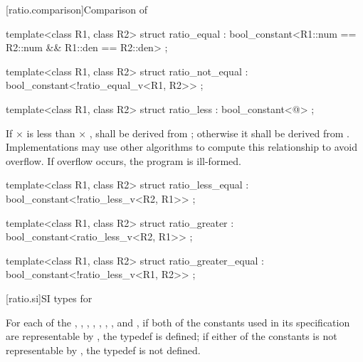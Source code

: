 [ratio.comparison]{Comparison of }

%
\begin{itemdecl}
template<class R1, class R2>
  struct ratio_equal : bool_constant<R1::num == R2::num && R1::den == R2::den> { };
\end{itemdecl}

%
\begin{itemdecl}
template<class R1, class R2>
  struct ratio_not_equal : bool_constant<!ratio_equal_v<R1, R2>> { };
\end{itemdecl}

%
\begin{itemdecl}
template<class R1, class R2>
  struct ratio_less : bool_constant<@\seebelow@> { };
\end{itemdecl}

\begin{itemdescr}
\pnum
If  $\times$  is less than  $\times$ ,
 shall be
derived from ; otherwise it shall be derived from
. Implementations may use other algorithms to
compute this relationship to avoid overflow. If overflow occurs, the program is ill-formed.
\end{itemdescr}

%
\begin{itemdecl}
template<class R1, class R2>
  struct ratio_less_equal : bool_constant<!ratio_less_v<R2, R1>> { };
\end{itemdecl}

%
\begin{itemdecl}
template<class R1, class R2>
  struct ratio_greater : bool_constant<ratio_less_v<R2, R1>> { };
\end{itemdecl}

%
\begin{itemdecl}
template<class R1, class R2>
  struct ratio_greater_equal : bool_constant<!ratio_less_v<R1, R2>> { };
\end{itemdecl}

[ratio.si]{SI types for }

\pnum
{}%
%
%
%
%
%
%
%
For each of the 
, ,
, ,
, ,
, and ,
if both of the constants used in its
specification are representable by , the typedef is
defined; if either of the constants is not representable by ,
the typedef is not defined.
